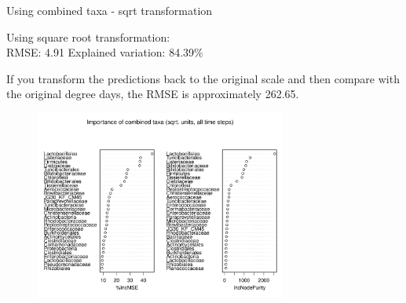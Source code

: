 \documentclass{beamer}
\begin{document}
\begin{frame}{Using combined taxa - sqrt transformation}

  {\scriptsize
    
  \noindent Using square root transformation:\\
  RMSE: 4.91  \hspace{0.05in}  Explained variation: 84.39\%

  \vspace{0.05in}
  
  \noindent If you transform the predictions back to the original
  scale and then compare with the original degree days, the RMSE is
  approximately 262.65.
  
\begin{center}
\begin{figure}
  \includegraphics[width=3.25in]{../all_together/all_time_steps/sqrt_units_all_data_combined_imp_plot}
\end{figure}
\end{center}
\vspace{-0.25in}
}
  
\end{frame}
\end{document}
